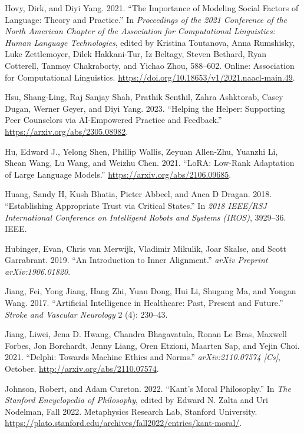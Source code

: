 \documentclass[
  letterpaper,
  numbers=noenddot,
  DIV=11]{scrreprt}
\newlength{\cslhangindent}
\newenvironment{CSLReferences}[2] %
 {\begin{list}{}{%
  \setlength{\itemindent}{0pt}
  \setlength{\leftmargin}{0pt}
  \setlength{\parsep}{0pt}
  \ifodd #1
   \setlength{\leftmargin}{\cslhangindent}
   \setlength{\itemindent}{-1\cslhangindent}
  \fi
  \setlength{\itemsep}{#2\baselineskip}}}
 {\end{list}}
\theoremstyle{definition}
\theoremstyle{plain}
\theoremstyle{plain}
\theoremstyle{remark}
\begin{document}
\begin{CSLReferences}{1}{0}
Hovy, Dirk, and Diyi Yang. 2021. {``The Importance of Modeling Social
Factors of Language: Theory and Practice.''} In \emph{Proceedings of the
2021 Conference of the North American Chapter of the Association for
Computational Linguistics: Human Language Technologies}, edited by
Kristina Toutanova, Anna Rumshisky, Luke Zettlemoyer, Dilek Hakkani-Tur,
Iz Beltagy, Steven Bethard, Ryan Cotterell, Tanmoy Chakraborty, and
Yichao Zhou, 588--602. Online: Association for Computational
Linguistics. \url{https://doi.org/10.18653/v1/2021.naacl-main.49}.

Hsu, Shang-Ling, Raj Sanjay Shah, Prathik Senthil, Zahra Ashktorab,
Casey Dugan, Werner Geyer, and Diyi Yang. 2023. {``Helping the Helper:
Supporting Peer Counselors via AI-Empowered Practice and Feedback.''}
\url{https://arxiv.org/abs/2305.08982}.

Hu, Edward J., Yelong Shen, Phillip Wallis, Zeyuan Allen-Zhu, Yuanzhi
Li, Shean Wang, Lu Wang, and Weizhu Chen. 2021. {``LoRA: Low-Rank
Adaptation of Large Language Models.''}
\url{https://arxiv.org/abs/2106.09685}.

Huang, Sandy H, Kush Bhatia, Pieter Abbeel, and Anca D Dragan. 2018.
{``Establishing Appropriate Trust via Critical States.''} In \emph{2018
IEEE/RSJ International Conference on Intelligent Robots and Systems
(IROS)}, 3929--36. IEEE.

Hubinger, Evan, Chris van Merwijk, Vladimir Mikulik, Joar Skalse, and
Scott Garrabrant. 2019. {``An Introduction to Inner Alignment.''}
\emph{arXiv Preprint arXiv:1906.01820}.

Jiang, Fei, Yong Jiang, Hang Zhi, Yuan Dong, Hui Li, Shugang Ma, and
Yongan Wang. 2017. {``Artificial Intelligence in Healthcare: Past,
Present and Future.''} \emph{Stroke and Vascular Neurology} 2 (4):
230--43.

Jiang, Liwei, Jena D. Hwang, Chandra Bhagavatula, Ronan Le Bras, Maxwell
Forbes, Jon Borchardt, Jenny Liang, Oren Etzioni, Maarten Sap, and Yejin
Choi. 2021. {``Delphi: {Towards} {Machine} {Ethics} and {Norms}.''}
\emph{arXiv:2110.07574 {[}Cs{]}}, October.
\url{http://arxiv.org/abs/2110.07574}.

Johnson, Robert, and Adam Cureton. 2022. {``Kant's {Moral}
{Philosophy}.''} In \emph{The {Stanford} {Encyclopedia} of
{Philosophy}}, edited by Edward N. Zalta and Uri Nodelman, Fall 2022.
Metaphysics Research Lab, Stanford University.
\url{https://plato.stanford.edu/archives/fall2022/entries/kant-moral/}.


\end{CSLReferences}
\end{document}

